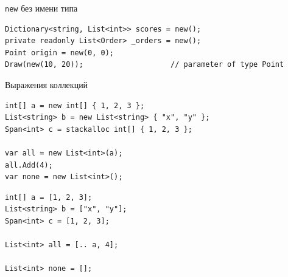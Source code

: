 \documentclass[aspectratio=169,10pt,t]{beamer}
\newcommand{\twocol}{\ttfamily\fontsize{7.0}{8.2}\selectfont}
\begin{document}
\begin{frame}[fragile]{\texttt{new} без имени типа}
  \slidetop

\begin{lstlisting}[style=csharp,basicstyle=\ttfamily\small]
Dictionary<string, List<int>> scores = new();
private readonly List<Order> _orders = new();
Point origin = new(0, 0);
Draw(new(10, 20));                    // parameter of type Point
\end{lstlisting}

  \slidegap
\end{frame}

\begin{frame}[fragile]{Выражения коллекций}
  \slidetop
  \begin{minipage}[t]{0.52\textwidth}
    \par\vspace{0.5em}
\begin{lstlisting}[style=csharp,basicstyle=\twocol]
int[] a = new int[] { 1, 2, 3 };
List<string> b = new List<string> { "x", "y" };
Span<int> c = stackalloc int[] { 1, 2, 3 };

var all = new List<int>(a);
all.Add(4);
var none = new List<int>();
\end{lstlisting}
  \end{minipage}\hfill
  \begin{minipage}[t]{0.44\textwidth}
    \par\vspace{0.5em}
\begin{lstlisting}[style=csharp,basicstyle=\twocol]
int[] a = [1, 2, 3];
List<string> b = ["x", "y"];
Span<int> c = [1, 2, 3];

List<int> all = [.. a, 4];

List<int> none = [];
\end{lstlisting}
  \end{minipage}

  \slidegap
\end{frame}
\end{document}
